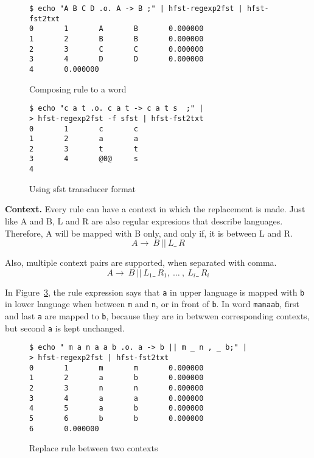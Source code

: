 \documentclass{llncs}
\begin{document}
\begin{figure} [h!]
\begin{verbatim}
$ echo "A B C D .o. A -> B ;" | hfst-regexp2fst | hfst-fst2txt
0       1       A       B       0.000000
1       2       B       B       0.000000
2       3       C       C       0.000000
3       4       D       D       0.000000
4       0.000000
\end{verbatim}
\caption{Composing rule to a word}
\label{fig:replace_compose}
\end{figure}


\begin{figure} [h!]
\begin{verbatim}
$ echo "c a t .o. c a t -> c a t s  ;" |
> hfst-regexp2fst -f sfst | hfst-fst2txt
0       1       c       c
1       2       a       a
2       3       t       t
3       4       @0@     s
4
\end{verbatim}
\caption{Using sfst transducer format}
\label{fig:sfst_format}
\end{figure}




\textbf{Context.} Every rule can have a context in which the replacement is made. Just like A and B, L and R are also regular expresions that describe languages. Therefore, A will be mapped with B only, and only if, it is between L and R.
\begin{equation}
A \rightarrow\ B\ ||\ L \_\  R
\end{equation}
 
Also, multiple context pairs are supported, when separated with comma.
\begin{equation}
A \rightarrow\ B\ ||\ L_1 \_\  R_1 ,\ \ldots\ ,\ L_i \_\  R_i
\end{equation}

In Figure~\ref{fig:multiple_contexts}, the rule expression says that \verb!a! in upper language is mapped with \verb!b! in lower language when between \verb!m! and \verb!n!, or in front of \verb!b!. In word \verb!manaab!, first and last \verb!a! are mapped to \verb!b!, because they are in betwwen corresponding contexts, but second \verb!a! is kept unchanged.

\begin{figure} [h!]
\begin{verbatim}
$ echo " m a n a a b .o. a -> b || m _ n , _ b;" |
> hfst-regexp2fst | hfst-fst2txt
0       1       m       m       0.000000
1       2       a       b       0.000000
2       3       n       n       0.000000
3       4       a       a       0.000000
4       5       a       b       0.000000
5       6       b       b       0.000000
6       0.000000
\end{verbatim}
\caption{Replace rule between two contexts}
\label{fig:multiple_contexts}
\end{figure}
\end{document}
